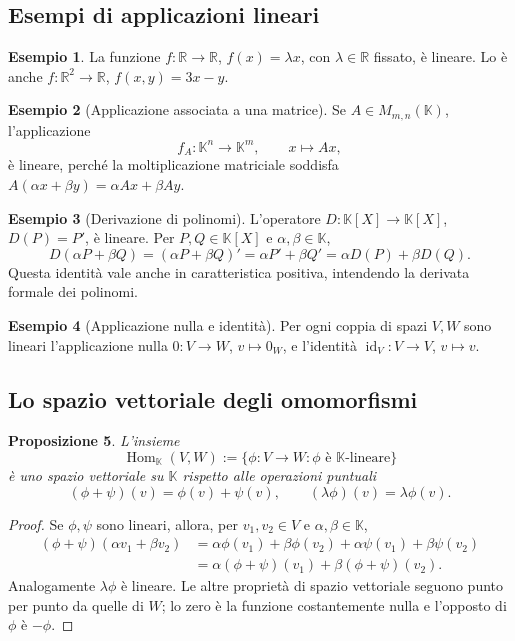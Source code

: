 \documentclass[11pt,a4paper]{article}
\newcommand{\RR}{\mathbb{R}}
\newcommand{\KK}{\mathbb{K}}
\theoremstyle{plain}
\newtheorem{prop}{Proposizione}[section]
\theoremstyle{definition}
\newtheorem{esempio}[prop]{Esempio}
\theoremstyle{remark}
\begin{document}
\subsection{Esempi di applicazioni lineari}

\begin{esempio}
La funzione $f:\RR\to\RR$, $f(x)=\lambda x$, con $\lambda\in\RR$
fissato, è lineare. Lo è anche
$f:\RR^2\to\RR$, $f(x,y)=3x-y$.
\end{esempio}

\begin{esempio}[Applicazione associata a una matrice]
Se $A\in M_{m,n}(\KK)$, l'applicazione
\[
 f_A:\KK^n\longrightarrow\KK^m,\qquad x\longmapsto Ax,
\]
è lineare, perché la moltiplicazione matriciale soddisfa
$A(\alpha x+\beta y)=\alpha Ax+\beta Ay$.
\end{esempio}

\begin{esempio}[Derivazione di polinomi]
L'operatore $D:\KK[X]\to\KK[X]$, $D(P)=P'$, è lineare.
Per $P,Q\in\KK[X]$ e $\alpha,\beta\in\KK$,
\[
 D(\alpha P+\beta Q)=(\alpha P+\beta Q)'
 =\alpha P'+\beta Q'=\alpha D(P)+\beta D(Q).
\]
Questa identità vale anche in caratteristica positiva, intendendo
la derivata formale dei polinomi.
\end{esempio}

\begin{esempio}[Applicazione nulla e identità]
Per ogni coppia di spazi $V,W$ sono lineari l'applicazione nulla
$0:V\to W$, $v\mapsto0_W$, e l'identità
$\operatorname{id}_V:V\to V$, $v\mapsto v$.
\end{esempio}

\subsection{Lo spazio vettoriale degli omomorfismi}

\begin{prop}
L'insieme
\[
 \operatorname{Hom}_{\KK}(V,W)
 :=\{\phi:V\to W:\phi\text{ è }\KK\text{-lineare}\}
\]
è uno spazio vettoriale su $\KK$ rispetto alle operazioni puntuali
\[
 (\phi+\psi)(v)=\phi(v)+\psi(v),\qquad
 (\lambda\phi)(v)=\lambda\phi(v).
\]
\end{prop}
\begin{proof}
Se $\phi,\psi$ sono lineari, allora, per $v_1,v_2\in V$ e
$\alpha,\beta\in\KK$,
\begin{align*}
 (\phi+\psi)(\alpha v_1+\beta v_2)
 &=\alpha\phi(v_1)+\beta\phi(v_2)
   +\alpha\psi(v_1)+\beta\psi(v_2)\\
 &=\alpha(\phi+\psi)(v_1)+\beta(\phi+\psi)(v_2).
\end{align*}
Analogamente $\lambda\phi$ è lineare. Le altre proprietà di spazio
vettoriale seguono punto per punto da quelle di $W$; lo zero è la
funzione costantemente nulla e l'opposto di $\phi$ è $-\phi$.
\end{proof}
\end{document}
